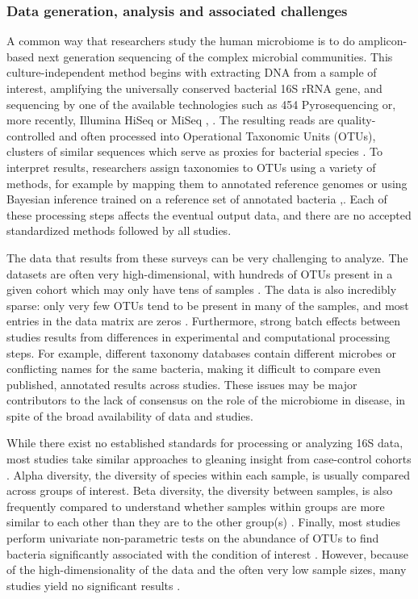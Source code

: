 \documentclass[12pt]{article}
\begin{document}
\subsubsection{Data generation, analysis and associated challenges} 
A common way that researchers study the human microbiome is to do 
amplicon-based next generation sequencing of the complex microbial 
communities. This culture-independent method begins with extracting
DNA from a sample of interest, amplifying the universally conserved
bacterial 16S rRNA gene, and sequencing by one of the available technologies such as 454 
Pyrosequencing or, more recently, Illumina HiSeq or MiSeq \cite{knights-supervised-2010}, \cite{sze-signal-2016}. 
The resulting reads are quality-controlled and often processed into Operational Taxonomic Units (OTUs), 
clusters of similar sequences which serve as proxies for bacterial 
species \cite{knights-supervised-2010}. To interpret results, researchers assign taxonomies to 
OTUs using a variety of methods, for example by mapping them to 
annotated reference genomes or using Bayesian inference trained on 
a reference set of annotated bacteria \cite{wang-rdp-2007},\cite{mcdonald-gg-201}. Each of 
these processing steps affects the eventual output data, and there
are no accepted standardized methods followed by all studies.

The data that results from these surveys can be very challenging to analyze.
The datasets are often very high-dimensional, with hundreds 
of OTUs present in a given cohort which may only have tens of samples \cite{sze-signal-2016}. 
The data is also incredibly sparse: only very few OTUs tend to be 
present in many of the samples, and most entries in the data matrix 
are zeros \cite{knights-biomarkers-2011}. 
Furthermore, strong batch effects between studies results from 
differences in experimental and computational processing steps.
For example, different taxonomy databases contain different 
microbes or conflicting names for the same bacteria, making it 
difficult to compare even published, annotated results across studies.  
These issues may be major contributors to the lack of consensus on the 
role of the microbiome in disease, in spite of the broad availability of data and studies.

While there exist no established standards for processing or analyzing 
16S data, most studies take similar approaches to gleaning insight 
from case-control cohorts \cite{knights-supervised-2010}. 
 Alpha diversity, the diversity of species within each sample, is usually compared across groups of interest. 
Beta diversity, the diversity between samples, is also frequently compared to understand whether 
samples within groups are more similar to each 
other than they are to the other group(s) \cite{knights-supervised-2010}. Finally, most studies perform 
univariate non-parametric tests on the abundance of OTUs to find 
bacteria significantly associated with the condition of interest \cite{wang-pval_method-2016}. 
However, because of the high-dimensionality of the data and the 
often very low sample sizes, many studies yield no significant
results \cite{wang-pval_method-2016}.
\end{document}

